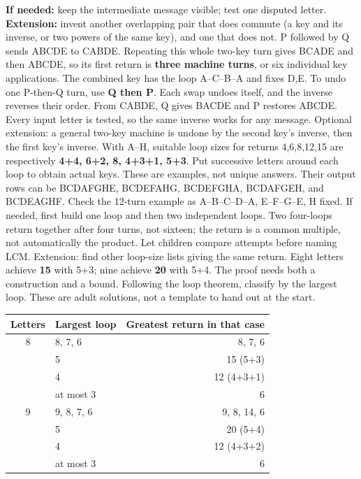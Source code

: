 \documentclass[11pt]{article}
\begin{document}
\textbf{If needed:} keep the intermediate message visible; test one disputed letter. \textbf{Extension:} invent another overlapping pair that does commute (a key and its inverse, or two powers of the same key), and one that does not.
P followed by Q sends ABCDE to CABDE. Repeating this whole two-key turn gives BCADE and then ABCDE, so its first return is \textbf{three machine turns}, or six individual key applications. The combined key has the loop A--C--B--A and fixes D,E.
To undo one P-then-Q turn, use \textbf{Q then P}. Each swap undoes itself, and the inverse reverses their order. From CABDE, Q gives BACDE and P restores ABCDE. Every input letter is tested, so the same inverse works for any message. Optional extension: a general two-key machine is undone by the second key's inverse, then the first key's inverse.
\newpage
{}
With A--H, suitable loop sizes for returns 4,6,8,12,15 are respectively \textbf{4+4, 6+2, 8, 4+3+1, 5+3}. Put successive letters around each loop to obtain actual keys. These are examples, not unique answers. Their output rows can be BCDAFGHE, BCDEFAHG, BCDEFGHA, BCDAFGEH, and BCDEAGHF. Check the 12-turn example as A--B--C--D--A, E--F--G--E, H fixed.
If needed, first build one loop and then two independent loops. Two four-loops return together after four turns, not sixteen; the return is a common multiple, not automatically the product. Let children compare attempts before naming LCM. Extension: find other loop-size lists giving the same return.
Eight letters achieve \textbf{15} with 5+3; nine achieve \textbf{20} with 5+4. The proof needs both a construction and a bound. Following the loop theorem, classify by the largest loop. These are adult solutions, not a template to hand out at the start.
\begin{center}\renewcommand{\arraystretch}{1.35}\begin{tabular}{c|l|r}Letters&Largest loop&Greatest return in that case\\\hline8&8, 7, 6&8, 7, 6\\&5&15 (5+3)\\&4&12 (4+3+1)\\&at most 3&6\\\hline9&9, 8, 7, 6&9, 8, 14, 6\\&5&20 (5+4)\\&4&12 (4+3+2)\\&at most 3&6\end{tabular}\end{center}
\end{document}
